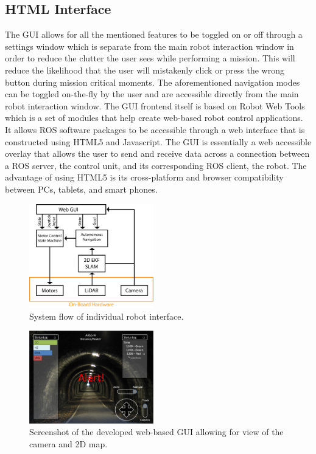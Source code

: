 \subsection{HTML Interface}

The GUI allows for all the mentioned features to be toggled on or off through a settings window which is separate from the main robot interaction window in order to reduce the clutter the user sees while performing a mission. This will reduce the likelihood that the user will mistakenly click or press the wrong button during mission critical moments. The aforementioned navigation modes can be toggled on-the-fly by the user and are accessible directly from the main robot interaction window. The GUI frontend itself is based on Robot Web Tools \cite{webtools} which is a set of modules that help create web-based robot control applications. It allows ROS software packages to be accessible through a web interface that is constructed using HTML5 and Javascript. The GUI is essentially a web accessible overlay that allows the user to send and receive data across a connection between a ROS server, the control unit, and its corresponding ROS client, the robot. The advantage of using HTML5 is its cross-platform and browser compatibility between PCs, tablets, and smart phones.
 
\begin{figure}
	\centering
	\includegraphics[width=0.48\textwidth]{pictures/Korpela_GUI.png}
	\caption{System flow of individual robot interface.}
	\label{gui_flow}
\end{figure}

\begin{figure}
	\centering
	\includegraphics[width=0.48\textwidth]{pictures/gui.png}
	\caption{Screenshot of the developed web-based GUI allowing for view of the camera and 2D map.}
	\label{gui_screenshot}
\end{figure}
